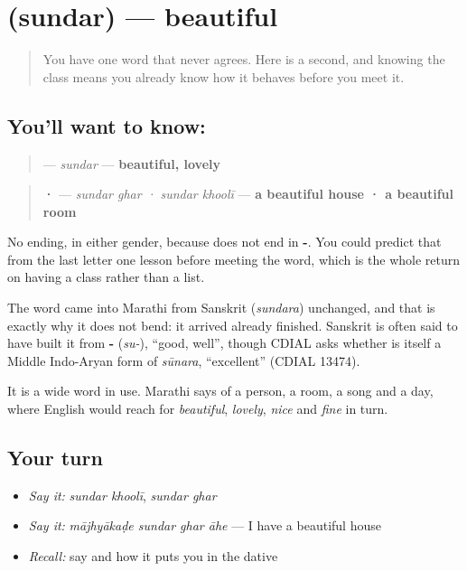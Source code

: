 \section[\texorpdfstring{\mr{सुंदर} (sundar)}{सुंदर (sundar)}]{ (sundar) — beautiful}

\label{lesson:MR-C50-sundar}



\begin{quote}
You have one word that never agrees. Here is a second, and knowing the class means you already know how it behaves before you meet it.
\end{quote}

\subsection*{You'll want to know: }
\begin{quote}
\textbf{} — \emph{sundar} — \textbf{beautiful, lovely}
\end{quote}

\begin{quote}
\textbf{  ·  } — \emph{sundar ghar · sundar khoolī} — \textbf{a beautiful house · a beautiful room}
\end{quote}

No ending, in either gender, because \textbf{} does not end in \textbf{-}. You could predict that from the last letter one lesson before meeting the word, which is the whole return on having a class rather than a list.

The word came into Marathi from Sanskrit \textbf{} (\emph{sundara}) unchanged, and that is exactly why it does not bend: it arrived already finished. Sanskrit is often said to have built it from \textbf{-} (\emph{su-}), \textquotedblleft{}good, well\textquotedblright{}, though CDIAL asks whether \textbf{} is itself a Middle Indo-Aryan form of \emph{sūnara}, \textquotedblleft{}excellent\textquotedblright{} (CDIAL 13474).

It is a wide word in use. Marathi says \textbf{} of a person, a room, a song and a day, where English would reach for \emph{beautiful}, \emph{lovely}, \emph{nice} and \emph{fine} in turn.

\subsection*{Your turn}
\begin{itemize}
\raggedright
  \item \emph{Say it:} \emph{sundar khoolī}, \emph{sundar ghar}
  \item \emph{Say it:} \emph{mājhyākaḍe sundar ghar āhe} — I have a beautiful house
  \item \emph{Recall:} say \textbf{} and how it puts you in the dative
\end{itemize}

